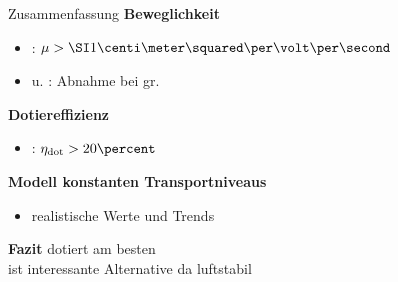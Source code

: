 \begin{frame}{Zusammenfassung}{}
{\bfseries Beweglichkeit}\par
\begin{itemize}
\item \CrPd : $\mob>\cmVs{1}$
\item \CrPd u. \WPd: Abnahme bei gr. \C
\end{itemize}

\vspace*{1ex}
{\bfseries Dotiereffizienz}\par
\begin{itemize}
\item \CrPd : $\DopEff>20\percent$
\end{itemize}

\vspace*{1ex}
{\bfseries Modell konstanten Transportniveaus}\par
\begin{itemize}
\item realistische Werte und Trends
\end{itemize}

\vspace*{1ex}
\begin{block}
{\bfseries Fazit}
\CrPd dotiert \CS am besten
\\\dmbi ist interessante Alternative da luftstabil
\end{block}
\end{frame}
%
